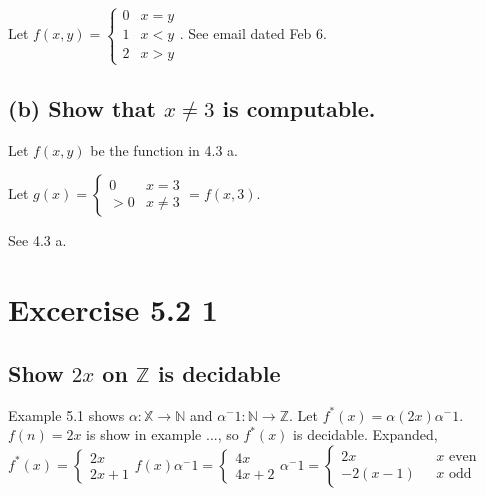 \documentclass[fleqn]{article}
\begin{document}
Let $f(x, y) = \begin{cases}0&x=y\\1&x<y\\2&x>y\end{cases}$. See email dated Feb 6.

\subsection*{(b) Show that $x\neq3$ is computable.}

Let $f(x, y)$ be the function in 4.3 a.

Let $g(x) = \begin{cases}0&x = 3\\>0&x\neq3\end{cases} = f(x, 3)$.

See 4.3 a.

\section*{Excercise 5.2 1}
\subsection*{Show $2x$ on $\mathbb{Z}$ is decidable}

Example 5.1 shows $\alpha: \mathbb{X}\to\mathbb{N}$ and $\alpha^-1: \mathbb{N}\to\mathbb{Z}$.
Let $f^*(x) = \alpha(2x)\alpha^-1$. $f(n) = 2x$ is show in example ..., so $f^*(x)$ is decidable.
Expanded, $f^*(x) =
\begin{cases}2x\\2x+1\end{cases} f(x)\alpha^-1 =
\begin{cases}4x\\4x+2\end{cases} \alpha^-1 =
\begin{cases}2x & \text{   } x \text{ even}\\-2(x-1) & \text {   } x \text{ odd}\end{cases}
$
\end{document}
